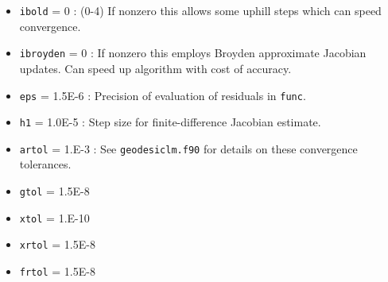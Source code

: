 \documentclass[12pt,pdf,singlespace]{article}
\begin{document}

\begin{itemize}

\item \texttt{ibold} = 0 : (0-4) If nonzero this allows some uphill steps which can speed convergence.
\item \texttt{ibroyden} = 0 : If nonzero this employs Broyden approximate Jacobian updates. Can speed up algorithm with cost of accuracy.
\item \texttt{eps} = 1.5E-6 : Precision of evaluation of residuals in \texttt{func}.


\item \texttt{h1} = 1.0E-5 : Step size for finite-difference Jacobian estimate.
\item \texttt{artol} = 1.E-3 : See \texttt{geodesiclm.f90} for details on these convergence tolerances.
\item \texttt{gtol} = 1.5E-8
\item \texttt{xtol} = 1.E-10
\item \texttt{xrtol} = 1.5E-8
\item \texttt{frtol} = 1.5E-8

\end{itemize}


\end{document}
